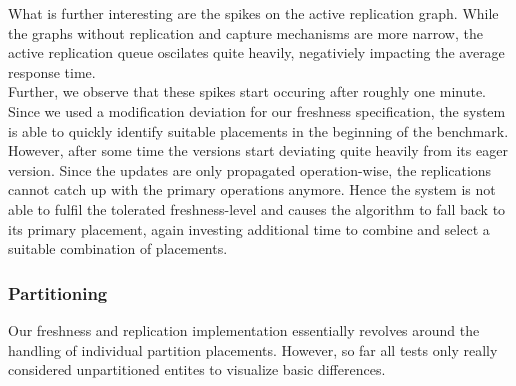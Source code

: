 What is further interesting are the spikes on the active replication graph. While the graphs without replication and capture mechanisms are more narrow,
the active replication queue oscilates quite heavily, negativiely impacting the average response time.\\
Further, we observe that these spikes start occuring after roughly one minute.
Since we used a modification deviation for our freshness specification, the system is able to quickly identify suitable placements in the beginning of the benchmark.
However, after some time the versions start deviating quite heavily from its eager version.
Since the updates are only propagated operation-wise, the replications cannot catch up with the primary operations anymore.
Hence the system is not able to fulfil the tolerated freshness-level and
causes the algorithm to fall back to its primary placement, again investing additional time to combine and select a suitable combination of placements.\\




\subsubsection{Partitioning} 

Our freshness and replication implementation essentially revolves around the handling of individual partition placements.
However, so far all tests only really considered unpartitioned entites to visualize basic differences. 

